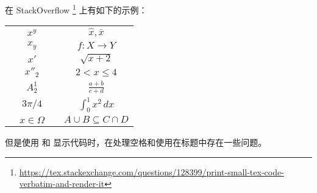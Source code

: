 在 StackOverflow
\footnote{\url{https://tex.stackexchange.com/questions/128399/print-small-tex-code-verbatim-and-render-it}}
上有如下的示例：

\begin{texcode}
\newcommand\showcase[1]{{\ttfamily\detokenize{#1}} & $#1$}
\begin{tabular}{cc|cc}
\showcase{x^{y}}      & \showcase{\hat{x}, \bar{x}} \\
\showcase{x_{y}}      & \showcase{f\colon X \to Y} \\
\showcase{x'}         & \showcase{\sqrt{x+2}} \\
\showcase{x''_{2}}    & \showcase{2 < x \leq 4} \\
\showcase{A^{1}_{2}}  & \showcase{\frac{a+b}{c+d}} \\
\showcase{3\pi/4}     & \showcase{\int_{0}^{1} x^{2} \,dx} \\
\showcase{x\in\Omega} & \showcase{A \cup B \subseteq C \cap D}
\end{tabular}
\end{texcode}

但是使用  和  显示代码时，在处理空格和使用在标题中存在一些问题。
